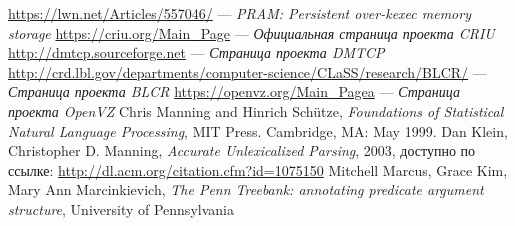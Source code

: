 

\renewcommand{\bibname}{Использованные источники и ссылки}
\begin{thebibliography}{100}
 \url{https://lwn.net/Articles/557046/} --- \emph{PRAM: Persistent over-kexec memory storage}
 \url{https://criu.org/Main_Page} --- \emph{Официальная страница проекта CRIU}
 \url{http://dmtcp.sourceforge.net} --- \emph{Страница проекта DMTCP}
 \url{http://crd.lbl.gov/departments/computer-science/CLaSS/research/BLCR/} --- \emph{Страница проекта BLCR}
 \url{https://openvz.org/Main_Pagea} --- \emph{Страница проекта OpenVZ}
 Chris Manning and Hinrich Schütze, \emph{Foundations of Statistical Natural Language Processing}, MIT Press. Cambridge, MA: May 1999.
 Dan Klein, Christopher D. Manning, \emph{Accurate Unlexicalized Parsing}, 2003, 
доступно по ссылке: \url{http://dl.acm.org/citation.cfm?id=1075150}
 Mitchell Marcus, Grace Kim, Mary Ann Marcinkievich, \emph{The Penn Treebank: annotating predicate argument structure}, University of Pennsylvania
\end{thebibliography}

